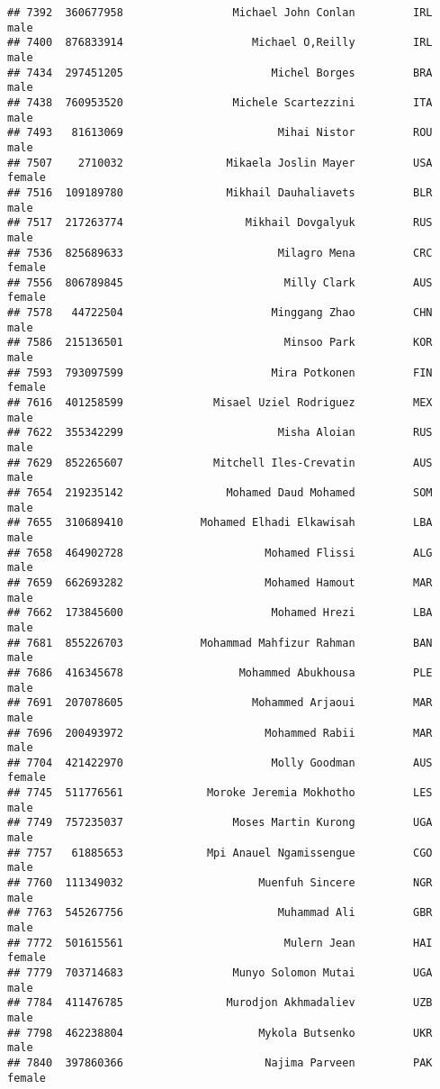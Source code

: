 \documentclass[]{article}
\begin{document}
\begin{verbatim}
## 7392  360677958                 Michael John Conlan         IRL   male
## 7400  876833914                    Michael O,Reilly         IRL   male
## 7434  297451205                       Michel Borges         BRA   male
## 7438  760953520                 Michele Scartezzini         ITA   male
## 7493   81613069                        Mihai Nistor         ROU   male
## 7507    2710032                Mikaela Joslin Mayer         USA female
## 7516  109189780                Mikhail Dauhaliavets         BLR   male
## 7517  217263774                   Mikhail Dovgalyuk         RUS   male
## 7536  825689633                        Milagro Mena         CRC female
## 7556  806789845                         Milly Clark         AUS female
## 7578   44722504                       Minggang Zhao         CHN   male
## 7586  215136501                         Minsoo Park         KOR   male
## 7593  793097599                       Mira Potkonen         FIN female
## 7616  401258599              Misael Uziel Rodriguez         MEX   male
## 7622  355342299                        Misha Aloian         RUS   male
## 7629  852265607              Mitchell Iles-Crevatin         AUS   male
## 7654  219235142                Mohamed Daud Mohamed         SOM   male
## 7655  310689410            Mohamed Elhadi Elkawisah         LBA   male
## 7658  464902728                      Mohamed Flissi         ALG   male
## 7659  662693282                      Mohamed Hamout         MAR   male
## 7662  173845600                       Mohamed Hrezi         LBA   male
## 7681  855226703            Mohammad Mahfizur Rahman         BAN   male
## 7686  416345678                  Mohammed Abukhousa         PLE   male
## 7691  207078605                    Mohammed Arjaoui         MAR   male
## 7696  200493972                      Mohammed Rabii         MAR   male
## 7704  421422970                       Molly Goodman         AUS female
## 7745  511776561             Moroke Jeremia Mokhotho         LES   male
## 7749  757235037                 Moses Martin Kurong         UGA   male
## 7757   61885653             Mpi Anauel Ngamissengue         CGO   male
## 7760  111349032                     Muenfuh Sincere         NGR   male
## 7763  545267756                        Muhammad Ali         GBR   male
## 7772  501615561                         Mulern Jean         HAI female
## 7779  703714683                 Munyo Solomon Mutai         UGA   male
## 7784  411476785                Murodjon Akhmadaliev         UZB   male
## 7798  462238804                     Mykola Butsenko         UKR   male
## 7840  397860366                      Najima Parveen         PAK female

\end{verbatim}
\end{document}
